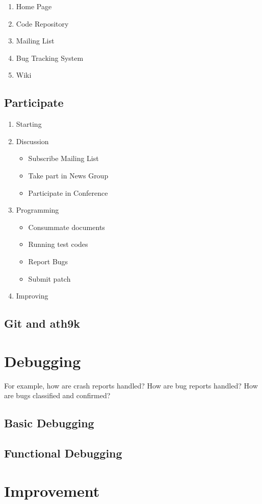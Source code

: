 \documentclass[draftclsnofoot,journal,onecolumn,12pt]{IEEEtran}
\begin{document}
\begin{enumerate}
  \item Home Page
  \item Code Repository
  \item Mailing List
  \item Bug Tracking System
  \item Wiki
\end{enumerate}

\subsection{Participate}

\begin{enumerate}
  \item Starting
  \item Discussion
  \begin{itemize}
    \item Subscribe Mailing List
    \item Take part in News Group
    \item Participate in Conference
  \end{itemize}
  \item Programming
  \begin{itemize}
    \item Consummate documents
    \item Running test codes
    \item Report Bugs
    \item Submit patch
  \end{itemize}
  \item Improving
\end{enumerate}

\subsection{Git and ath9k}


\section{Debugging}

For example, how are crash reports handled? How are bug reports handled? How are bugs classified and confirmed?

\subsection{Basic Debugging}

\subsection{Functional Debugging}

\section{Improvement}

\nocite{*}

\renewcommand\refname{References}


\end{document}
